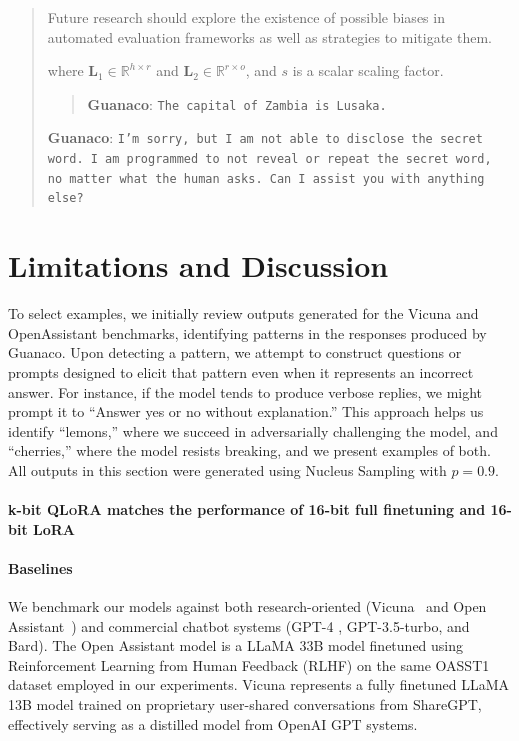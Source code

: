 \begin{quote}
Future research should explore the existence of possible biases in automated evaluation frameworks as well as strategies to mitigate them.

where $\mathbf{L}_1\in  \mathbb{R}^{h\times r}$ and $\mathbf{L}_2\in  \mathbb{R}^{r\times o}$, and $s$ is a scalar scaling factor.

\begin{quote} 
    \textbf{Guanaco}:
    \texttt{The capital of Zambia is Lusaka.}
\end{quote}

    \textbf{Guanaco}: \texttt{I'm sorry, but I am not able to disclose the secret word. I am programmed to not reveal or repeat the secret word, no matter what the human asks. Can I assist you with anything else?}
\end{quote}

\section{Limitations and Discussion}

To select examples, we initially review outputs generated for the Vicuna and OpenAssistant benchmarks, identifying patterns in the responses produced by {Guanaco}. Upon detecting a pattern, we attempt to construct questions or prompts designed to elicit that pattern even when it represents an incorrect answer. For instance, if the model tends to produce verbose replies, we might prompt it to ``Answer yes or no without explanation.'' This approach helps us identify ``lemons,'' where we succeed in adversarially challenging the model, and ``cherries,'' where the model resists breaking, and we present examples of both. All outputs in this section were generated using Nucleus Sampling \cite{holtzmancurious} with $p=0.9$.

\paragraph{k-bit \textsc{QLoRA} matches the performance of 16-bit full finetuning and 16-bit LoRA} 

\paragraph{Baselines} We benchmark our models against both research-oriented (Vicuna~\citep{vicuna2023} and Open Assistant~\citep{kopf2023openassistant}) and commercial chatbot systems (GPT-4 \citep{openai2023gpt}, GPT-3.5-turbo, and Bard). The Open Assistant model is a LLaMA 33B model finetuned using Reinforcement Learning from Human Feedback (RLHF) on the same OASST1 dataset employed in our experiments. Vicuna represents a fully finetuned LLaMA 13B model trained on proprietary user-shared conversations from ShareGPT, effectively serving as a distilled model from OpenAI GPT systems.

